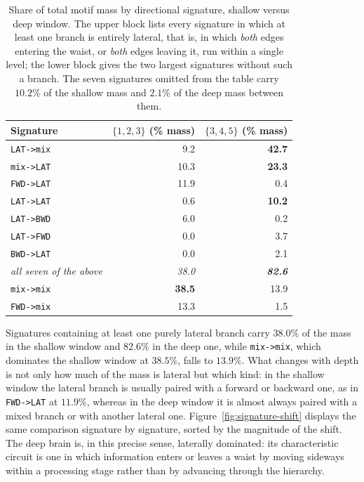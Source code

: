 \documentclass[12pt,a4paper,oneside]{article}
\theoremstyle{definition}
\theoremstyle{plain}
\newcommand{\code}[1]{\texttt{#1}}
\begin{document}
\begin{table}[H]
\centering
\caption{Share of total motif mass by directional signature, shallow versus
deep window. The upper block lists every signature in which at least one
branch is entirely lateral, that is, in which \emph{both} edges entering the
waist, or \emph{both} edges leaving it, run within a single level; the lower
block gives the two largest signatures without such a branch. The seven
signatures omitted from the table carry $10.2\%$ of the shallow mass and
$2.1\%$ of the deep mass between them.}
\label{tab:signatures}
\begin{tabular}{lrr}
\toprule
Signature & $\{1,2,3\}$ (\% mass) & $\{3,4,5\}$ (\% mass) \\
\midrule
\code{LAT->mix}  &  9.2 & \textbf{42.7} \\
\code{mix->LAT}  & 10.3 & \textbf{23.3} \\
\code{FWD->LAT} & 11.9 &  0.4 \\
\code{LAT->LAT}  &  0.6 & \textbf{10.2} \\
\code{LAT->BWD} &  6.0 &  0.2 \\
\code{LAT->FWD} &  0.0 &  3.7 \\
\code{BWD->LAT} &  0.0 &  2.1 \\
\midrule
\emph{all seven of the above} & \emph{38.0} & \textbf{\emph{82.6}} \\
\midrule
\code{mix->mix}  & \textbf{38.5} & 13.9 \\
\code{FWD->mix}  & 13.3 &  1.5 \\
\bottomrule
\end{tabular}
\end{table}

Signatures containing at least one purely lateral branch carry $38.0\%$ of
the mass in the shallow window and $82.6\%$ in the deep one, while
\code{mix->mix}, which dominates the shallow window at $38.5\%$, falls to
$13.9\%$. What changes with depth is not only how much of the mass is
lateral but which kind: in the shallow window the lateral branch is usually
paired with a forward or backward one, as in \code{FWD->LAT} at $11.9\%$,
whereas in the deep window it is almost always paired with a mixed branch or
with another lateral one. Figure~\ref{fig:signature-shift} displays the same comparison
signature by signature, sorted by the magnitude of the shift. The deep brain
is, in this precise sense, laterally dominated: its characteristic circuit
is one in which information enters or leaves a waist by moving sideways
within a processing stage rather than by advancing through the hierarchy.
\end{document}
